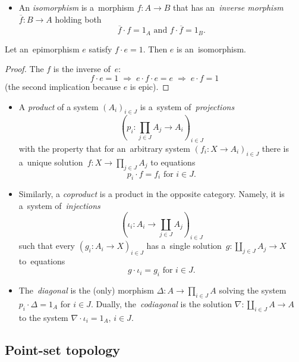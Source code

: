 \begin{itemize}
\item An \emph{isomorphism} is a~morphism $f\colon A \to B$ that has
an~\emph{inverse morphism\/} $\overline{f}\colon B \to A$ holding both
\[
  \overline{f} \cdot f = 1_A \text{ and } f \cdot \overline{f} = 1_B.
\]
\end{itemize}

\begin{lem} \label{lem:epi->iso}
  Let an~epimorphism $e$ satisfy $f \cdot e = 1$.
  Then $e$ is an~isomorphism.
\end{lem}
\begin{proof}
  The $f$ is the inverse of~$e$:
  \[
    f \cdot e = 1 \; \Rightarrow \; e \cdot f \cdot e = e \; \Rightarrow \; e
    \cdot f = 1
  \]
  (the second implication because $e$ is epic).
\end{proof}

\begin{itemize}
\item A \emph{product} of a system $\left(A_i\right)_{i\in J}$ is a~system
of~\emph{projections\/}
\[
  \left(p_i\colon \prod_{j\in J} A_j \to A_i \right)_{i\in J}
\]
with the property that for an~arbitrary system $\left(f_i\colon X \to
A_i\right)_{i\in J}$ there is a~unique solution~$f\colon X \to \prod_{j\in
J} A_j$ to equations
\[
  p_i \cdot f = f_i \text{ for } i\in J.
\]

\item Similarly, a \emph{coproduct} is a product in the opposite category.
Namely, it is a~system of~\emph{injections\/}
\[
  \left(\iota_i\colon A_i \to \coprod_{j\in J} A_j \right)_{i\in J}
\]
such that every $\left(g_i\colon A_i \to X \right)_{i\in J}$ has a~single
solution~$g\colon \coprod_{j\in J} A_j \to X$ to~equations
\[
  g \cdot \iota_i = g_i \text{ for } i\in J.
\]

\item The~\emph{diagonal} is the (only) morphism $\Delta\colon A \to \prod_{i\in
J} A$ solving the system $p_i\cdot \Delta = 1_A$ for $i \in J$.
Dually, the~\emph{codiagonal} is the solution $\nabla\colon \coprod_{i\in J} A
\to A$ to the system $\nabla\cdot \iota_i = 1_A, \, i \in J$.
\end{itemize}


\subsection*{Point-set topology}

